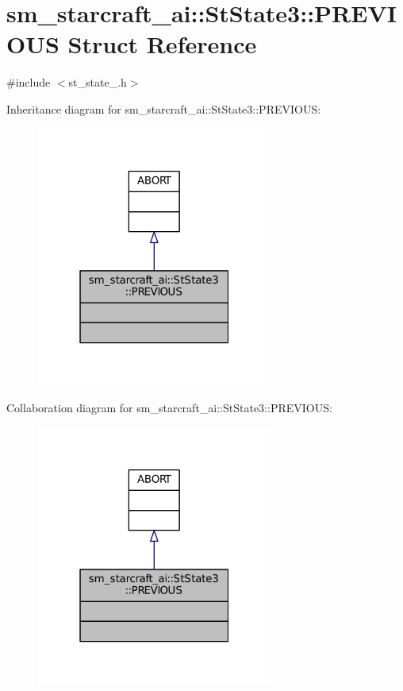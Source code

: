 \hypertarget{structsm__starcraft__ai_1_1StState3_1_1PREVIOUS}{}\section{sm\+\_\+starcraft\+\_\+ai\+:\+:St\+State3\+:\+:P\+R\+E\+V\+I\+O\+US Struct Reference}
\label{structsm__starcraft__ai_1_1StState3_1_1PREVIOUS}


{\ttfamily \#include $<$st\+\_\+state\+\_.\+h$>$}



Inheritance diagram for sm\+\_\+starcraft\+\_\+ai\+:\+:St\+State3\+:\+:P\+R\+E\+V\+I\+O\+US\+:
\nopagebreak
\begin{figure}[H]
\begin{center}
\leavevmode
\includegraphics[width=220pt]{structsm__starcraft__ai_1_1StState3_1_1PREVIOUS__inherit__graph}
\end{center}
\end{figure}


Collaboration diagram for sm\+\_\+starcraft\+\_\+ai\+:\+:St\+State3\+:\+:P\+R\+E\+V\+I\+O\+US\+:
\nopagebreak
\begin{figure}[H]
\begin{center}
\leavevmode
\includegraphics[width=220pt]{structsm__starcraft__ai_1_1StState3_1_1PREVIOUS__coll__graph}
\end{center}
\end{figure}


